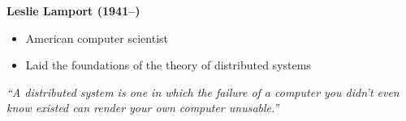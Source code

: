 {
\begin{frame}[plain,t]
\vfill
\begin{minipage}{.45\textwidth}
\hspace{1em}\textbf{\large Leslie Lamport (1941--)}
\begin{itemize}
\item American computer scientist
\item Laid the foundations of the theory of distributed systems
\end{itemize}

\bigskip

\emph{
``A distributed system is one in which the failure of a computer you didn't even know existed can render your own computer unusable.''}
\end{minipage}
\end{frame}
}



